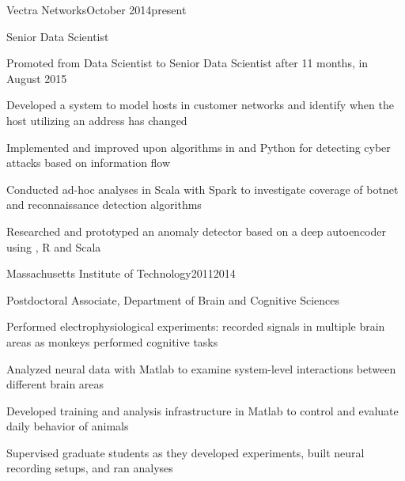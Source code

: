 \documentclass{report}
\begin{document}

  \begin{work_location}{Vectra Networks}{October 2014}{present}

    \begin{position}{Senior Data Scientist}
      \item Promoted from Data Scientist to Senior Data Scientist after 11 months, in August 2015
      \item Developed a system to model hosts in customer networks and identify when the host utilizing an address has changed
      \item Implemented and improved upon algorithms in \CC{} and Python for detecting cyber attacks based on information flow
      \item Conducted ad-hoc analyses in Scala with Spark to investigate coverage of botnet and reconnaissance detection algorithms
      \item Researched and prototyped an anomaly detector based on a deep autoencoder using \HzO{}, R and Scala
    \end{position}

  \end{work_location}



  \begin{work_location}{Massachusetts Institute of Technology}{2011}{2014}

    \begin{position}{Postdoctoral Associate, Department of Brain and Cognitive Sciences}
      \item {} Performed electrophysiological experiments: recorded signals in multiple brain areas as monkeys performed cognitive tasks
      \item Analyzed neural data with Matlab to examine system-level interactions between different brain areas
      \item Developed training and analysis infrastructure in Matlab to control and evaluate daily behavior of animals
      \item Supervised graduate students as they developed experiments, built neural recording setups, and ran analyses
    \end{position}

  \end{work_location}


\end{document}

